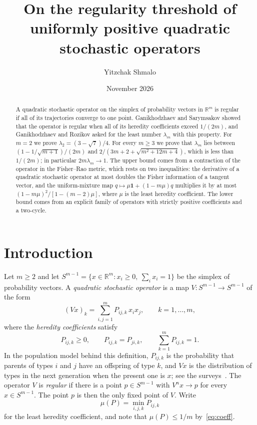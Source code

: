 \documentclass[11pt]{amsart}
\title[The regularity threshold of positive quadratic stochastic operators]{On the regularity threshold of uniformly positive quadratic stochastic operators}
\author{Yitzchak Shmalo}
\date{November 2026}
\theoremstyle{definition}
\theoremstyle{remark}
\newcommand{\R}{\mathbb{R}}
\begin{document}
\begin{abstract}
A quadratic stochastic operator on the simplex of probability vectors in $\R^m$ is regular if all of its trajectories
converge to one point. Ganikhodzhaev and Sarymsakov showed that the operator is regular when all of its heredity
coefficients exceed $1/(2m)$, and Ganikhodzhaev and Rozikov asked for the least number $\lambda_m$ with this property.
For $m=2$ we prove $\lambda_2=(3-\sqrt7)/4$. For every $m\ge3$ we prove that $\lambda_m$ lies between
$(1-1/\sqrt{m+1})/(2m)$ and $2/(3m+2+\sqrt{m^2+12m+4})$, which is less than $1/(2m)$; in particular
$2m\lambda_m\to1$. The upper bound comes from a contraction of the operator in the Fisher--Rao metric, which
rests on two inequalities: the derivative of a quadratic stochastic operator at most doubles the Fisher information of
a tangent vector, and the uniform-mixture map $q\mapsto\mu\mathbf 1+(1-m\mu)q$ multiplies it by at most
$(1-m\mu)^2/[1-(m-2)\mu]$, where $\mu$ is the least heredity coefficient. The lower bound comes from an explicit family of operators with strictly positive coefficients
and a two-cycle.
\end{abstract}
\maketitle

\section{Introduction}\label{sec:intro}

Let $m\ge2$ and let $S^{m-1}=\{x\in\R^m:x_i\ge0,\ \sum_ix_i=1\}$ be the simplex of probability vectors. A
\emph{quadratic stochastic operator} is a map $V:S^{m-1}\to S^{m-1}$ of the form
\begin{equation}\label{eq:qso}
(Vx)_k=\sum_{i,j=1}^m P_{ij,k}\,x_ix_j,\qquad k=1,\dots,m,
\end{equation}
where the \emph{heredity coefficients} satisfy
\begin{equation}\label{eq:coeff}
P_{ij,k}\ge0,\qquad P_{ij,k}=P_{ji,k},\qquad \sum_{k=1}^mP_{ij,k}=1 .
\end{equation}
In the population model behind this definition, $P_{ij,k}$ is the probability that parents of types $i$ and $j$ have
an offspring of type $k$, and $Vx$ is the distribution of types in the next generation when the present one is $x$; see
the surveys~\cite{GR09,GMR11}. The operator $V$ is \emph{regular} if there is a point $p\in S^{m-1}$ with $V^nx\to p$
for every $x\in S^{m-1}$. The point $p$ is then the only fixed point of $V$. Write
\[
\mu(P)=\min_{i,j,k}P_{ij,k}
\]
for the least heredity coefficient, and note that $\mu(P)\le1/m$ by~\eqref{eq:coeff}.
\end{document}
